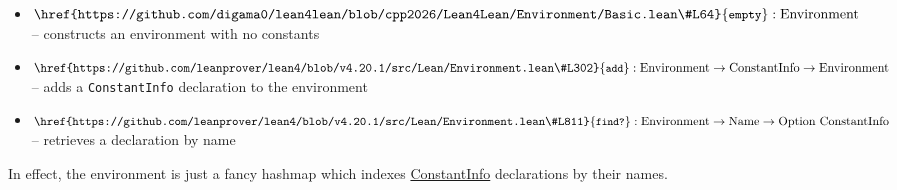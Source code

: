 \documentclass[sigplan,10pt,screen]{acmart}\settopmatter{printfolios=true,printccs=false,printacmref=false}
\newcommand{\code}[1]{\mbox{\ttfamily\small #1}}
\begin{document}
\begin{itemize}
  \item $\mbox{\href{https://github.com/digama0/lean4lean/blob/cpp2026/Lean4Lean/Environment/Basic.lean\#L64}{\code{empty}}} : \mbox{\lstinline|Environment|}$\\ -- constructs an environment with no constants
  \item $\mbox{\href{https://github.com/leanprover/lean4/blob/v4.20.1/src/Lean/Environment.lean\#L302}{\code{add}}} : \mbox{\lstinline|Environment|}\to\mbox{\lstinline|ConstantInfo|}\to\mbox{\lstinline|Environment|}$\\ -- adds a \lstinline|ConstantInfo| declaration to the environment
  \item $\mbox{\href{https://github.com/leanprover/lean4/blob/v4.20.1/src/Lean/Environment.lean\#L811}{\code{find?}}} : \mbox{\lstinline|Environment|} \to \mbox{\lstinline|Name|} \to \mbox{\lstinline|Option ConstantInfo|}$\\ -- retrieves a declaration by name
\end{itemize}
In effect, the environment is just a fancy hashmap which indexes \href{https://github.com/leanprover/lean4/blob/v4.20.1/src/Lean/Declaration.lean#L417}{\code{ConstantInfo}} declarations by their names.
\end{document}
